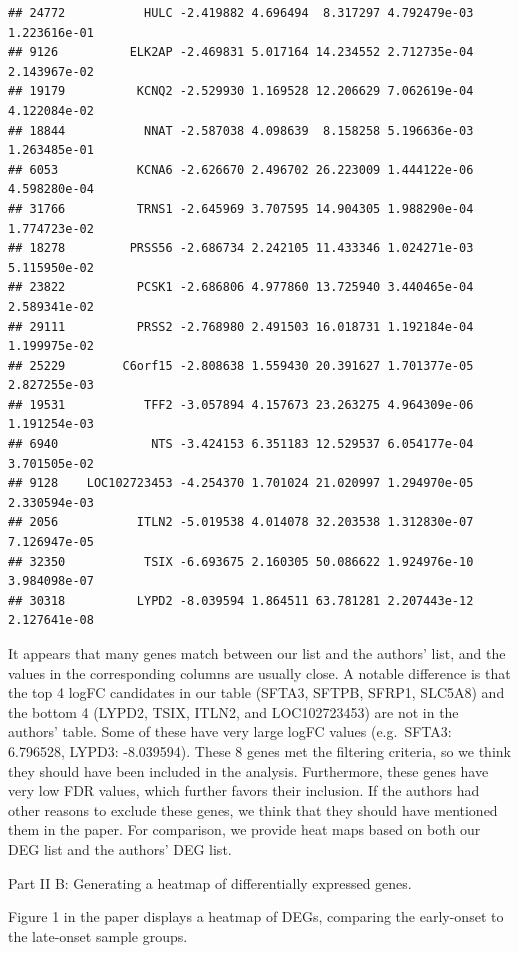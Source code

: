 \documentclass[
]{article}
\begin{document}
\begin{verbatim}
## 24772           HULC -2.419882 4.696494  8.317297 4.792479e-03 1.223616e-01
## 9126          ELK2AP -2.469831 5.017164 14.234552 2.712735e-04 2.143967e-02
## 19179          KCNQ2 -2.529930 1.169528 12.206629 7.062619e-04 4.122084e-02
## 18844           NNAT -2.587038 4.098639  8.158258 5.196636e-03 1.263485e-01
## 6053           KCNA6 -2.626670 2.496702 26.223009 1.444122e-06 4.598280e-04
## 31766          TRNS1 -2.645969 3.707595 14.904305 1.988290e-04 1.774723e-02
## 18278         PRSS56 -2.686734 2.242105 11.433346 1.024271e-03 5.115950e-02
## 23822          PCSK1 -2.686806 4.977860 13.725940 3.440465e-04 2.589341e-02
## 29111          PRSS2 -2.768980 2.491503 16.018731 1.192184e-04 1.199975e-02
## 25229        C6orf15 -2.808638 1.559430 20.391627 1.701377e-05 2.827255e-03
## 19531           TFF2 -3.057894 4.157673 23.263275 4.964309e-06 1.191254e-03
## 6940             NTS -3.424153 6.351183 12.529537 6.054177e-04 3.701505e-02
## 9128    LOC102723453 -4.254370 1.701024 21.020997 1.294970e-05 2.330594e-03
## 2056           ITLN2 -5.019538 4.014078 32.203538 1.312830e-07 7.126947e-05
## 32350           TSIX -6.693675 2.160305 50.086622 1.924976e-10 3.984098e-07
## 30318          LYPD2 -8.039594 1.864511 63.781281 2.207443e-12 2.127641e-08
\end{verbatim}

It appears that many genes match between our list and the authors' list,
and the values in the corresponding columns are usually close. A notable
difference is that the top 4 logFC candidates in our table (SFTA3,
SFTPB, SFRP1, SLC5A8) and the bottom 4 (LYPD2, TSIX, ITLN2, and
LOC102723453) are not in the authors' table. Some of these have very
large \textbar logFC\textbar{} values (e.g.~SFTA3: 6.796528, LYPD3:
-8.039594). These 8 genes met the filtering criteria, so we think they
should have been included in the analysis. Furthermore, these genes have
very low FDR values, which further favors their inclusion. If the
authors had other reasons to exclude these genes, we think that they
should have mentioned them in the paper. For comparison, we provide heat
maps based on both our DEG list and the authors' DEG list.

Part II B: Generating a heatmap of differentially expressed genes.

Figure 1 in the paper displays a heatmap of DEGs, comparing the
early-onset to the late-onset sample groups.
\end{document}
